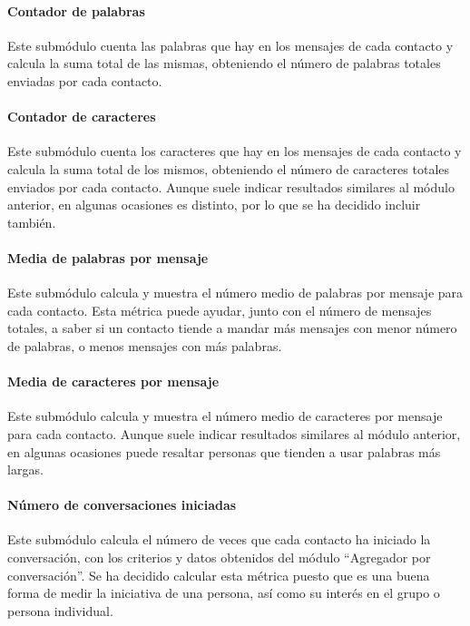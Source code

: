 \paragraph{Contador de palabras}

Este submódulo cuenta las palabras que hay en los mensajes de cada contacto y calcula la suma total de las mismas, obteniendo el número de palabras totales enviadas por cada contacto.

\paragraph{Contador de caracteres}

Este submódulo cuenta los caracteres que hay en los mensajes de cada contacto y calcula la suma total de los mismos, obteniendo el número de caracteres totales enviados por cada contacto. Aunque suele indicar resultados similares al módulo anterior, en algunas ocasiones es distinto, por lo que se ha decidido incluir también.

\paragraph{Media de palabras por mensaje}

Este submódulo calcula y muestra el número medio de palabras por mensaje para cada contacto. Esta métrica puede ayudar, junto con el número de mensajes totales, a saber si un contacto tiende a mandar más mensajes con menor número de palabras, o menos mensajes con más palabras.


\paragraph{Media de caracteres por mensaje}

Este submódulo calcula y muestra el número medio de caracteres por mensaje para cada contacto. Aunque suele indicar resultados similares al módulo anterior, en algunas ocasiones puede resaltar personas que tienden a usar palabras más largas.


\paragraph{Número de conversaciones iniciadas}

Este submódulo calcula el número de veces que cada contacto ha iniciado la conversación, con los criterios y datos obtenidos del módulo ``Agregador por conversación''. Se ha decidido calcular esta métrica puesto que es una buena forma de medir la iniciativa de una persona, así como su interés en el grupo o persona individual.


